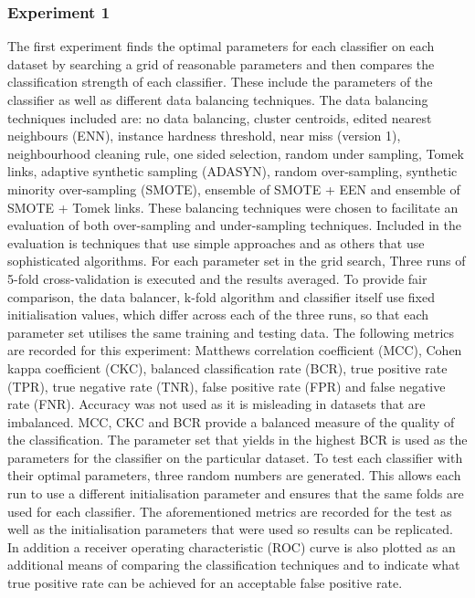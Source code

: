 \documentclass{sig-alternate-05-2015}
\begin{document}
	\subsubsection{Experiment 1}
	\label{method-experiment-1}
	The first experiment finds the optimal parameters for each classifier on each dataset by searching a grid of reasonable parameters and then compares the classification strength of each classifier. These include the parameters of the classifier as well as different data balancing techniques. The data balancing techniques included are: no data balancing, cluster centroids, edited nearest neighbours (ENN), instance hardness threshold, near miss (version 1), neighbourhood cleaning rule, one sided selection, random under sampling, Tomek links, adaptive synthetic sampling (ADASYN), random over-sampling, synthetic minority over-sampling (SMOTE), ensemble of SMOTE + EEN and ensemble of SMOTE + Tomek links. These balancing techniques were chosen to facilitate an evaluation of both over-sampling and under-sampling techniques. Included in the evaluation is techniques that use simple approaches and as others that use sophisticated algorithms. For each parameter set in the grid search, Three runs of 5-fold cross-validation is executed and the results averaged. To provide fair comparison, the data balancer, k-fold algorithm and classifier itself use fixed initialisation values, which differ across each of the three runs, so that each parameter set utilises the same training and testing data. The following metrics are recorded for this experiment: Matthews correlation coefficient (MCC), Cohen kappa coefficient (CKC), balanced classification rate (BCR), true positive rate (TPR), true negative rate (TNR), false positive rate (FPR) and false negative rate (FNR). Accuracy was not used as it is misleading in datasets that are imbalanced. MCC, CKC and BCR provide a balanced measure of the quality of the classification. The parameter set that yields in the highest BCR is used as the parameters for the classifier on the particular dataset. To test each classifier with their optimal parameters, three random numbers are generated. This allows each run to use a different initialisation parameter and ensures that the same folds are used for each classifier. The aforementioned metrics are recorded for the test as well as the initialisation parameters that were used so results can be replicated. In addition a receiver operating characteristic (ROC) curve is also plotted as an additional means of comparing the classification techniques and to indicate what true positive rate can be achieved for an acceptable false positive rate. 
	
\end{document}

